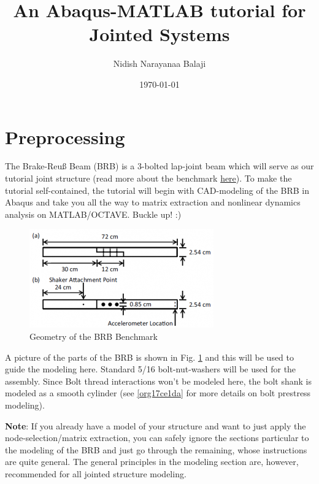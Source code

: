 \documentclass[11pt]{article}
\author{Nidish Narayanaa Balaji}
\date{\today}
\title{An Abaqus-MATLAB tutorial for Jointed Systems}
\begin{document}
\maketitle
\tableofcontents


\section{Preprocessing}
\label{sec:org9565201}

The Brake-Reuß Beam (BRB) is a 3-bolted lap-joint beam which will serve as our tutorial joint structure (read more about the benchmark \href{https://jointmechanics.org/index.php/Benchmarks\#The\_Brake-Reu\%C3\%9F\_Beams}{here}).
To make the tutorial self-contained, the tutorial will begin with CAD-modeling of the BRB in Abaqus and take you all the way to matrix extraction and nonlinear dynamics analysis on MATLAB/OCTAVE.
Buckle up! :)

\begin{figure}[htbp]
\centering
\includegraphics[width=.9\linewidth]{./figs/300px-BRB.png}
\caption{\label{fig:org0a364b6}Geometry of the BRB Benchmark}
\end{figure}

A picture of the parts of the BRB is shown in Fig. \ref{fig:org0a364b6} and this will be used to guide the modeling here.
Standard 5/16 bolt-nut-washers will be used for the assembly. Since Bolt thread interactions won't be modeled here, the bolt shank is modeled as a smooth cylinder (see \ref{org17ce1da} for more details on bolt prestress modeling).

\textbf{Note}: If you already have a model of your structure and want to just apply the node-selection/matrix extraction, you can safely ignore the sections particular to the modeling of the BRB and just go through the remaining, whose instructions are quite general.
The general principles in the modeling section are, however, recommended for all jointed structure modeling.
\end{document}
